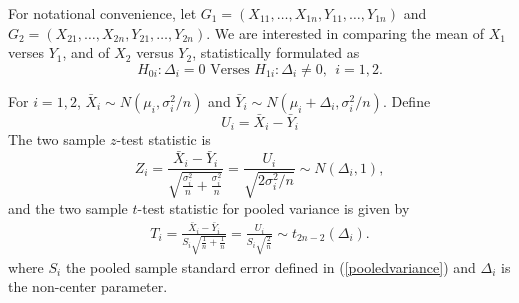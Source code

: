 \documentclass[12pt, a4paper]{article}
\begin{document}
\begin{appendix}
			For notational convenience, let $G_1 = (X_{11}, \ldots, X_{1n}, Y_{11}, \ldots, Y_{1n})$ and $G_2 = 
			(X_{21}, \ldots, X_{2n}, Y_{21}, \ldots, Y_{2n})$. We are interested in comparing the mean of $X_1$
			verses $Y_1$, and of $X_2$ versus $Y_2$, statistically formulated as
			\begin{equation}\label{hypotheses1}
			H_{0i}:  \Delta_i = 0 \text{     Verses   }  H_{1i}: \Delta_i\neq 0 ,  ~~ i = 1, 2.
			\end{equation}
			
			
			For $i =1, 2$,  $\bar{X}_{i}\sim N(\mu_i, \sigma_i^2/n)$ and $\bar{Y}_{i}\sim N(\mu_i + \Delta_i,
			\sigma_i^2/n)$. Define
			\begin{equation}\label{expreU}
			U_i = \bar{X}_i - \bar{Y}_i
			\end{equation}
			The two sample $z$-test statistic is
			\begin{equation}\label{zTest}
			Z_i = \frac{\bar{X}_{i}-\bar{Y}_{i} }{\sqrt{\frac{\sigma^2_i}{n} + \frac{\sigma^2_i}{n}}} =
			\frac{U_i}{\sqrt{2\sigma_i^2/n}}\sim N(\Delta_i, 1) ,
			\end{equation}
			and the two sample $t$-test statistic for pooled variance is given by
			\begin{align}\label{t-test}
			T_i = \frac{\bar{X}_i - \bar{Y}_i}{S_i\sqrt{\frac{1}{n}+\frac{1}{n}}} =
			\frac{U_i}{S_i\sqrt{\frac{2}{n}}} \sim t_{2n-2}(\Delta_i). 
			\end{align}
			where $S_i$ the pooled sample standard error defined in (\ref{pooledvariance}) and $\Delta_i$ is the
			non-center parameter. 
		
		
		
		\newpage
		
	\end{appendix}
	
	
	
\end{document}
